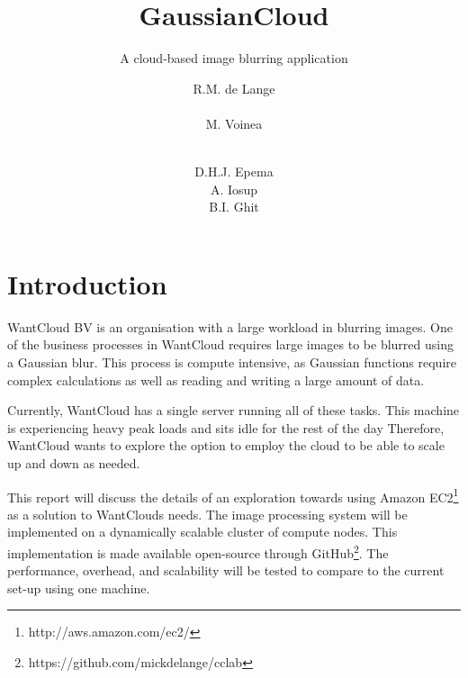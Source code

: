 \documentclass{acm_proc_article-sp}
\begin{document}
\title{GaussianCloud}
\subtitle{A cloud-based image blurring application}

\author{
\alignauthor
R.M. de Lange\\
		\\
\alignauthor
M. Voinea\\
		\\
\and
\alignauthor
D.H.J. Epema\\
\alignauthor
A. Iosup\\
\alignauthor
B.I. Ghit\\
}

\maketitle

\begin{abstract}
\end{abstract}

\section{Introduction}
WantCloud BV is an organisation with a large workload in blurring images.
One of the business processes in WantCloud requires large images to be blurred using a Gaussian blur.
This process is compute intensive, as Gaussian functions require complex calculations as well as reading and writing a large amount of data.

Currently, WantCloud has a single server running all of these tasks.
This machine is experiencing heavy peak loads and sits idle for the rest of the day
Therefore, WantCloud wants to explore the option to employ the cloud to be able to scale up and down as needed.

This report will discuss the details of an exploration towards using Amazon EC2\footnote{http://aws.amazon.com/ec2/} as a solution to WantClouds needs.
The image processing system will be implemented on a dynamically scalable cluster of compute nodes.
This implementation is made available open-source through GitHub\footnote{https://github.com/mickdelange/cclab}.
The performance, overhead, and scalability will be tested to compare to the current set-up using one machine.
\end{document}
